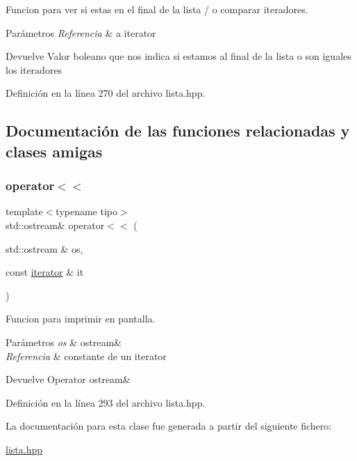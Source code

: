 Funcion para ver si estas en el final de la lista / o comparar iteradores. 


\begin{DoxyParams}{Parámetros}
{\em Referencia} & a iterator \\
\hline
\end{DoxyParams}
\begin{DoxyReturn}{Devuelve}
Valor boleano que nos indica si estamos al final de la lista o son iguales los iteradores 
\end{DoxyReturn}


Definición en la línea 270 del archivo lista.\+hpp.



\subsection{Documentación de las funciones relacionadas y clases amigas}
\mbox{\label{classLista_1_1iterator_ab86d5cacfaca06c9075ddb7427cf7ddb}} 
\subsubsection{\texorpdfstring{operator$<$$<$}{operator<<}}
{\footnotesize\ttfamily template$<$typename tipo$>$ \\
std\+::ostream\& operator$<$$<$ (\begin{DoxyParamCaption}\item[{std\+::ostream \&}]{os,  }\item[{const \hyperlink{classLista_1_1iterator}{iterator} \&}]{it }\end{DoxyParamCaption})\hspace{0.3cm}{\ttfamily [friend]}}



Funcion para imprimir en pantalla. 


\begin{DoxyParams}{Parámetros}
{\em os} & ostream\& \\
\hline
{\em Referencia} & constante de un iterator \\
\hline
\end{DoxyParams}
\begin{DoxyReturn}{Devuelve}
Operator ostream\& 
\end{DoxyReturn}


Definición en la línea 293 del archivo lista.\+hpp.



La documentación para esta clase fue generada a partir del siguiente fichero\+:\begin{DoxyCompactItemize}
\item 
\hyperlink{lista_8hpp}{lista.\+hpp}\end{DoxyCompactItemize}
